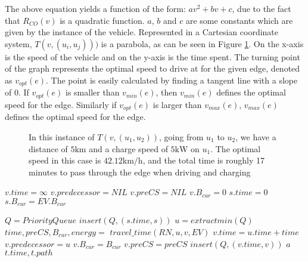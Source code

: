 The above equation yields a function of the form: $av^2 + bv + c$, due to the fact that $R_{CO}(v)$ is a quadratic function. $a$, $b$ and $c$ are some constants which are given by the instance of the vehicle. Represented in a Cartesian coordinate system, $T(v,(u_i, u_j)))$ is a parabola, as can be seen in Figure \ref{fig:graph}. On the x-axis is the speed of the vehicle and on the y-axis is the time spent. The turning point of the graph represents the optimal speed to drive at for the given edge, denoted as $v_{opt}(e)$. The point is easily calculated by finding a tangent line with a slope of $0$. If $v_{opt}(e)$ is smaller than $v_{min}(e)$, then $v_{min}(e)$ defines the optimal speed for the edge. Similarly if $v_{opt}(e)$ is larger than $v_{max}(e)$, $v_{max}(e)$ defines the optimal speed for the edge.

\begin{figure}[!htb]
\label{fig:graph}
% 
\caption{In this instance of $T(v,(u_1, u_2))$, going from $u_1$ to $u_2$, we have a distance of $5 \si{\km}$ and a charge speed of $5 \si{\kW}$ on $u_1$. The optimal speed in this case is $42.12\si{\km\per\hour}$, and the total time is roughly 17 minutes to pass through the edge when driving and charging}
\end{figure}



\begin{algorithmic}
		\State $v.time = \infty$
		\State $v.predecessor = NIL$
		\State $v.preCS = NIL$
		\State $v.B_{cur} = 0$
	\EndFor
	\State $s.time = 0$
	\State $s.B_{cur} = EV.B_{cur}$

	\State $Q = PriorityQueue$
	\State $insert(Q, (s.time, s))$	
		\State $u = extractmin(Q)$
			\State $time,preCS,B_{cur},energy = $
			\State $travel\_time(RN, u, v, EV)$
				\State $v.time = u.time + time$
				\State $v.predecessor = u$
				\State $v.B_{cur} = B_{cur}$
				\State $v.preCS = preCS$
				\State $insert(Q, (v.time, v))$	
			\EndIf
				\State $a$
			\EndIf
		\EndFor
	\EndWhile
	\State \Return $t.time, t.path$
\EndFunction
\end{algorithmic}\label{alg:fastest_path}

